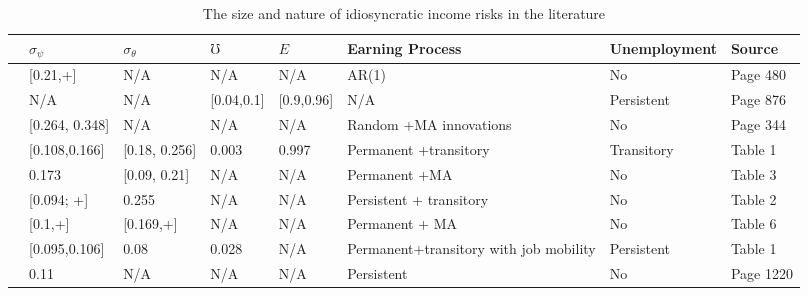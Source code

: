	\begin{sidewaystable}[p]
\centering
\begin{adjustbox}{width={\textwidth}}
\begin{threeparttable}
\caption{The size and nature of idiosyncratic income risks in the literature}
\label{tab:risks_literature}
\begin{tabular}{llllllll}
\hline 

                                 & $\sigma_\psi$  & $\sigma_\theta$ & $\mho$        & $E$          & Earning Process                        & Unemployment & Source    \\
                                 \hline 

\cite{huggett1996wealth}         & [0.21,+]       & N/A             & N/A           & N/A          & AR(1)                                  & No           & Page 480  \\
\cite{krusell1998income}         & N/A            & N/A             & [0.04,0.1]    & [0.9,0.96]   & N/A                                    & Persistent   & Page 876  \\
\cite{cagetti2003wealth}         & [0.264, 0.348] & N/A             & N/A           & N/A          & Random +MA innovations                 & No           & Page 344  \\
\cite{gourinchas2002consumption} & [0.108,0.166]  & [0.18, 0.256]   & 0.003         & 0.997        & Permanent +transitory                  & Transitory   & Table 1   \\
\cite{meghir2004income}          & 0.173          & [0.09, 0.21]    & N/A           & N/A          & Permanent +MA                          & No           & Table 3   \\
\cite{storesletten2004cyclical}  & [0.094; +]     & 0.255           & N/A           & N/A          & Persistent + transitory                & No           & Table 2   \\
\cite{blundell_consumption_2008} & [0.1,+]        & [0.169,+]       & N/A           & N/A          & Permanent + MA                         & No           & Table 6   \\
\cite{low2010wage}               & [0.095,0.106]  & 0.08            & 0.028         & N/A          & Permanent+transitory with job mobility & Persistent   & Table 1   \\
\cite{kaplan2014model}           & 0.11           & N/A             & N/A           & N/A          & Persistent                             & No           & Page 1220 \\

\end{tabular}
\end{threeparttable}
\end{adjustbox}
\end{sidewaystable}
